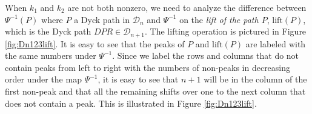 \documentclass[
final,nomarks
]{dmtcs-episciences}
\newcommand{\fref}[1]{Figure \ref{fig:#1}}
\newcommand{\lift}{\mathrm{lift}}
\begin{document}
When \begin{math}k_1\end{math} and \begin{math}k_2\end{math} are not both nonzero, we need to analyze the difference 
between \begin{math}\Psi^{-1}(P)\end{math} where \begin{math}P\end{math}  a Dyck path in \begin{math}\mathcal{D}_n\end{math} and \begin{math}\Psi^{-1}\end{math} on 
the \emph{lift of the path \begin{math}P\end{math}}, \begin{math}\lift(P)\end{math}, which is the Dyck path \begin{math}DPR \in 
\mathcal{D}_{n+1}\end{math}. The lifting operation is pictured in \fref{Dn123lift}. 
It is easy to see that the peaks of \begin{math}P\end{math} and \begin{math}\lift(P)\end{math} are labeled with the same 
numbers under \begin{math}\Psi^{-1}\end{math}. Since we label the rows and columns that do not contain peaks from left to right with the numbers of non-peaks 
in decreasing order under the map \begin{math}\Psi^{-1}\end{math}, it is easy to see that \begin{math}n+1\end{math} will be in the column of the first non-peak 
and that all the remaining shifts over one to the next column that does not contain a peak. 
This is illustrated in \fref{Dn123lift}.
\end{document}
